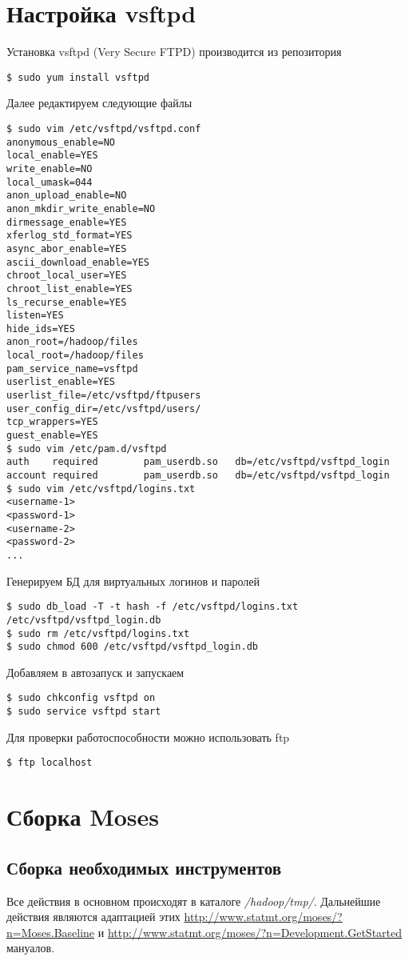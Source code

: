 \section{Настройка vsftpd}
Установка vsftpd (Very Secure FTPD) производится из репозитория
\begin{lstlisting}
$ sudo yum install vsftpd
\end{lstlisting}
Далее редактируем следующие файлы
\begin{lstlisting}
$ sudo vim /etc/vsftpd/vsftpd.conf
anonymous_enable=NO
local_enable=YES
write_enable=NO
local_umask=044
anon_upload_enable=NO
anon_mkdir_write_enable=NO
dirmessage_enable=YES
xferlog_std_format=YES
async_abor_enable=YES
ascii_download_enable=YES
chroot_local_user=YES
chroot_list_enable=YES
ls_recurse_enable=YES
listen=YES
hide_ids=YES
anon_root=/hadoop/files
local_root=/hadoop/files
pam_service_name=vsftpd
userlist_enable=YES
userlist_file=/etc/vsftpd/ftpusers
user_config_dir=/etc/vsftpd/users/
tcp_wrappers=YES
guest_enable=YES
$ sudo vim /etc/pam.d/vsftpd
auth    required        pam_userdb.so   db=/etc/vsftpd/vsftpd_login
account required        pam_userdb.so   db=/etc/vsftpd/vsftpd_login
$ sudo vim /etc/vsftpd/logins.txt
<username-1>
<password-1>
<username-2>
<password-2>
...
\end{lstlisting}

Генерируем БД для виртуальных логинов и паролей 
\begin{lstlisting}
$ sudo db_load -T -t hash -f /etc/vsftpd/logins.txt /etc/vsftpd/vsftpd_login.db
$ sudo rm /etc/vsftpd/logins.txt
$ sudo chmod 600 /etc/vsftpd/vsftpd_login.db
\end{lstlisting}

Добавляем в автозапуск и запускаем
\begin{lstlisting}
$ sudo chkconfig vsftpd on
$ sudo service vsftpd start
\end{lstlisting}

Для проверки работоспособности можно использовать ftp
\begin{lstlisting}
$ ftp localhost
\end{lstlisting}

\section{Сборка Moses}
\subsection{Сборка необходимых инструментов}
Все действия в основном происходят в каталоге \emph{/hadoop/tmp/}. Дальнейшие действия являются 
адаптацией этих \url{http://www.statmt.org/moses/?n=Moses.Baseline} и 
\url{http://www.statmt.org/moses/?n=Development.GetStarted} мануалов.

